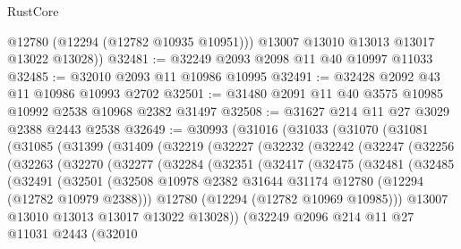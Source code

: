 \begin{lexlean}{RustCore}
\begin{coremodule}
          @12780
          (@12294 (@12782 @10935 @10951)))
        @13007
        @13010
        @13013
        @13017
        @13022
        @13028))
@32481 := @32249 @2093 @2098 @11 @40 @10997 @11033
@32485 := @32010 @2093 @11 @10986 @10995
@32491 := @32428 @2092 @43 @11 @10986 @10993 @2702
@32501 := @31480 @2091 @11 @40 @3575 @10985 @10992 @2538 @10968 @2382 @31497
@32508 := @31627 @214 @11 @27 @3029 @2388 @2443 @2538
@32649 := @30993
    (@31016
      (@31033
        (@31070
          (@31081
            (@31085
              (@31399
                (@31409
                  (@32219
                    (@32227
                      (@32232
                        (@32242
                          (@32247
                            (@32256
                              (@32263
                                (@32270
                                  (@32277
                                    (@32284
                                      (@32351
                                        (@32417
                                          (@32475
                                            (@32481
                                              (@32485
                                                (@32491
                                                  (@32501
                                                    (@32508
                                                      @10978
                                                      @2382
                                                      @31644
                                                      @31174
                                                      @12780
                                                      (@12294 (@12782 @10979 @2388)))
                                                    @12780
                                                    (@12294 (@12782 @10969 @10985)))
                                                  @13007
                                                  @13010
                                                  @13013
                                                  @13017
                                                  @13022
                                                  @13028))
                                              (@32249
                                                @2096
                                                @214
                                                @11
                                                @27
                                                @11031
                                                @2443
                                                (@32010

\end{coremodule}
\end{lexlean}
